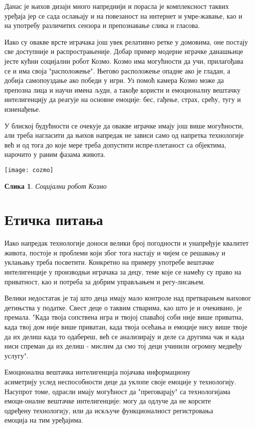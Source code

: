 \documentclass{article}
\newtheorem{image}{Слика}
\begin{document}
Данас је њихов дизајн много напреднији и порасла је комплексност таквих уређаја јер се сада ослањају и на повезаност на интернет и умре-жавање, као и на употребу различитих сензора и препознавање слика и гласова. 

Иако су овакве врсте играчака још увек релативно ретке у домовима, оне постају све доступније и распрострањеније. Добар пример модерне играчке данашњице јесте кућни социјални робот Козмо. Козмо има могућности да учи, прилагођава се и има своја "расположење". Његово расположење опадне ако је гладан, а добија самопоуздање ако победи у игри. Уз помоћ камера Козмо може да препозна лица и научи имена људи, а такође користи и емоционалну вештачку интелигенцију да реагује на основне емоције: бес, гађење, страх, срећу, тугу и изненађење.

У блиској будућности се очекује да овакве играчке имају још више могућности, али треба нагласити да њихов напредак не зависи само од напретка технологије већ и од тога до које мере треба допустити испре-плетаност са објектима, нарочито у раним фазама живота. 


\texttt{[image: cozmo]}
\begin{image}
\centering
Социјални робот Козмо
\end{image}


\section{Етичка питања}
Иако напредак технологије доноси велики број погодности и унапређује квалитет живота, постоје и проблеми који због тога настају и чијем се решавању и уклањању треба посветити. Конкретно на примеру употребе вештачке интелигенције у производњи играчака за децу, теме које се намећу су право на приватност,  као и потреба за добрим управљањем и регу-лисањем.

Велики недостатак је тај што деца имају мало контроле над претварањем њиховог детињства у податке. Свест деце о таквим стварима, као што је и очекивано, је премала. 
"Када твоја сопствена игра и твојој спаваћој соби није више приватна, када твој дом није више приватан, када твоја осећања и емоције нису више твоје да их делиш када то одабереш, већ се анализирају и деле са другима чак и када ниси спреман да их делиш - мислим да смо тој деци учинили огромну медвеђу услугу". \cite{mcstay2021emotional}

Емоционална вештачка интелигенција појачава информациону \\асиметрију услед неспособности деце да уклопе своје емоције у технологију. Насупрот томе, одрасли имају могућност да "преговарају" са технологијама  емоци-оналне вештачке интелигенције: могу да одлуче да не корсите \\одређену технологиjу, или да искључе функционалност регистровања \\емоција на тим уређајима.
\end{document}
